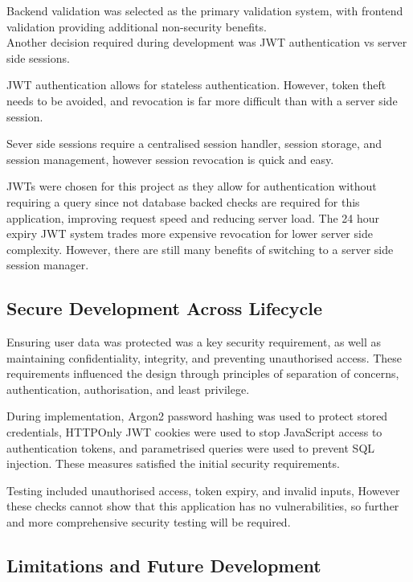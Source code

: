 Backend validation was selected as the primary validation system, with frontend validation providing additional non-security benefits.\noindent\vspace{20pt}\\%
%
%
Another decision required during development was JWT authentication vs server side sessions.

JWT authentication allows for stateless authentication. However, token theft needs to be avoided, and revocation is far more difficult than with a server side session.

Sever side sessions require a centralised session handler, session storage, and session management, however session revocation is quick and easy.

JWTs were chosen for this project as they allow for authentication without requiring a query since not database backed checks are required for this application, improving request speed and reducing server load. The 24 hour expiry JWT system trades more expensive revocation for lower server side complexity. However, there are still many benefits of switching to a server side session manager.



\subsection{Secure Development Across Lifecycle} %

Ensuring user data was protected was a key security requirement, as well as maintaining confidentiality, integrity, and preventing unauthorised access. These requirements influenced the design through principles of separation of concerns, authentication, authorisation, and least privilege.

During implementation, Argon2 password hashing was used to protect stored credentials, HTTPOnly JWT cookies were used to stop JavaScript access to authentication tokens, and parametrised queries were used to prevent SQL injection. These measures satisfied the initial security requirements.

Testing included unauthorised access, token expiry, and invalid inputs, However these checks cannot show that this application has no vulnerabilities, so further and more comprehensive security testing will be required.



\subsection{Limitations and Future Development} %

